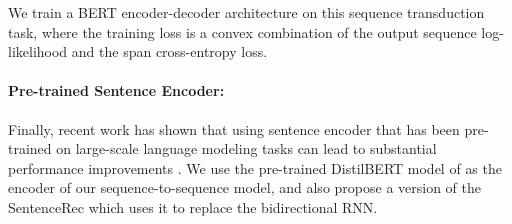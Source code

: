 We train a BERT encoder-decoder architecture on this sequence transduction task, where the training loss is a convex combination of the output sequence log-likelihood and the span cross-entropy loss.

\paragraph{Pre-trained Sentence Encoder: } Finally, recent work has shown that using sentence encoder that has been pre-trained on large-scale language modeling tasks can lead to substantial performance improvements \citep{song2019mass}.%
We use the pre-trained DistilBERT model of \cite{sanh2019distilbert} as the encoder of our sequence-to-sequence model, and also propose a version of the SentenceRec which uses it to replace the bidirectional RNN.
